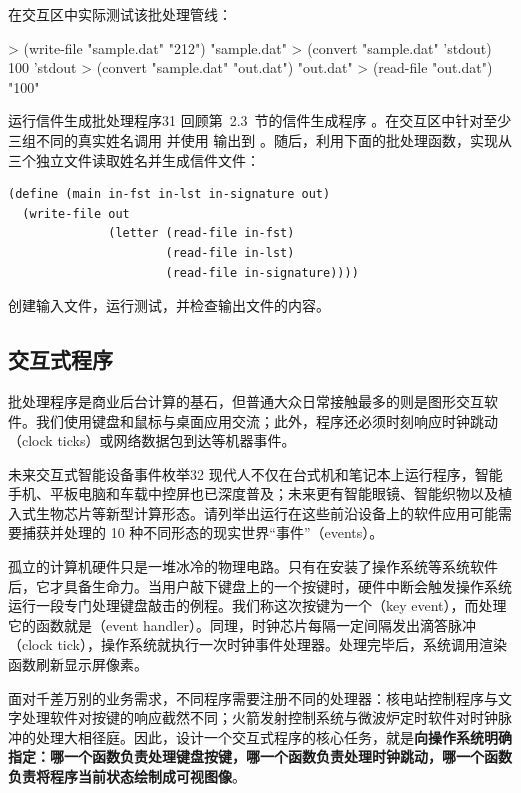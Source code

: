 在交互区中实际测试该批处理管线：
\begin{replbox}
> (write-file "sample.dat" "212")
"sample.dat"
> (convert "sample.dat" 'stdout)
100
'stdout
> (convert "sample.dat" "out.dat")
"out.dat"
> (read-file "out.dat")
"100\n"
\end{replbox}

\begin{exercise}{运行信件生成批处理程序}{31}
回顾第~2.3~节的信件生成程序 。在交互区中针对至少三组不同的真实姓名调用  并使用  输出到 。随后，利用下面的批处理函数，实现从三个独立文件读取姓名并生成信件文件：
\begin{lstlisting}[language=BSL]
(define (main in-fst in-lst in-signature out)
  (write-file out
              (letter (read-file in-fst)
                      (read-file in-lst)
                      (read-file in-signature))))
\end{lstlisting}
创建输入文件，运行测试，并检查输出文件的内容。
\end{exercise}

\subsection{交互式程序}

批处理程序是商业后台计算的基石，但普通大众日常接触最多的则是图形交互软件。我们使用键盘和鼠标与桌面应用交流；此外，程序还必须时刻响应时钟跳动（clock ticks）或网络数据包到达等机器事件。

\begin{exercise}{未来交互式智能设备事件枚举}{32}
现代人不仅在台式机和笔记本上运行程序，智能手机、平板电脑和车载中控屏也已深度普及；未来更有智能眼镜、智能织物以及植入式生物芯片等新型计算形态。请列举出运行在这些前沿设备上的软件应用可能需要捕获并处理的 10 种不同形态的现实世界“事件”（events）。
\end{exercise}

孤立的计算机硬件只是一堆冰冷的物理电路。只有在安装了操作系统等系统软件后，它才具备生命力。当用户敲下键盘上的一个按键时，硬件中断会触发操作系统运行一段专门处理键盘敲击的例程。我们称这次按键为一个（key event），而处理它的函数就是（event handler）。同理，时钟芯片每隔一定间隔发出滴答脉冲（clock tick），操作系统就执行一次时钟事件处理器。处理完毕后，系统调用渲染函数刷新显示屏像素。

面对千差万别的业务需求，不同程序需要注册不同的处理器：核电站控制程序与文字处理软件对按键的响应截然不同；火箭发射控制系统与微波炉定时软件对时钟脉冲的处理大相径庭。因此，设计一个交互式程序的核心任务，就是\textbf{向操作系统明确指定：哪一个函数负责处理键盘按键，哪一个函数负责处理时钟跳动，哪一个函数负责将程序当前状态绘制成可视图像}。

